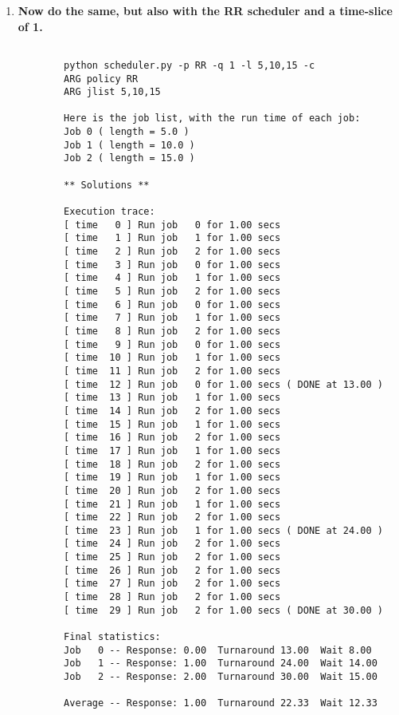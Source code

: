 \documentclass{article}
\begin{document}
\begin{enumerate}
    \item \textbf{Now do the same, but also with the RR scheduler and a time-slice of 1.}
    
    \begin{verbatim}
        
        python scheduler.py -p RR -q 1 -l 5,10,15 -c    
        ARG policy RR
        ARG jlist 5,10,15

        Here is the job list, with the run time of each job: 
        Job 0 ( length = 5.0 )
        Job 1 ( length = 10.0 )
        Job 2 ( length = 15.0 )

        ** Solutions **

        Execution trace:
        [ time   0 ] Run job   0 for 1.00 secs
        [ time   1 ] Run job   1 for 1.00 secs
        [ time   2 ] Run job   2 for 1.00 secs
        [ time   3 ] Run job   0 for 1.00 secs
        [ time   4 ] Run job   1 for 1.00 secs
        [ time   5 ] Run job   2 for 1.00 secs
        [ time   6 ] Run job   0 for 1.00 secs
        [ time   7 ] Run job   1 for 1.00 secs
        [ time   8 ] Run job   2 for 1.00 secs
        [ time   9 ] Run job   0 for 1.00 secs
        [ time  10 ] Run job   1 for 1.00 secs
        [ time  11 ] Run job   2 for 1.00 secs
        [ time  12 ] Run job   0 for 1.00 secs ( DONE at 13.00 )
        [ time  13 ] Run job   1 for 1.00 secs
        [ time  14 ] Run job   2 for 1.00 secs
        [ time  15 ] Run job   1 for 1.00 secs
        [ time  16 ] Run job   2 for 1.00 secs
        [ time  17 ] Run job   1 for 1.00 secs
        [ time  18 ] Run job   2 for 1.00 secs
        [ time  19 ] Run job   1 for 1.00 secs
        [ time  20 ] Run job   2 for 1.00 secs
        [ time  21 ] Run job   1 for 1.00 secs
        [ time  22 ] Run job   2 for 1.00 secs
        [ time  23 ] Run job   1 for 1.00 secs ( DONE at 24.00 )
        [ time  24 ] Run job   2 for 1.00 secs
        [ time  25 ] Run job   2 for 1.00 secs
        [ time  26 ] Run job   2 for 1.00 secs
        [ time  27 ] Run job   2 for 1.00 secs
        [ time  28 ] Run job   2 for 1.00 secs
        [ time  29 ] Run job   2 for 1.00 secs ( DONE at 30.00 )

        Final statistics:
        Job   0 -- Response: 0.00  Turnaround 13.00  Wait 8.00
        Job   1 -- Response: 1.00  Turnaround 24.00  Wait 14.00
        Job   2 -- Response: 2.00  Turnaround 30.00  Wait 15.00

        Average -- Response: 1.00  Turnaround 22.33  Wait 12.33
    \end{verbatim}


\end{enumerate}
\end{document}
